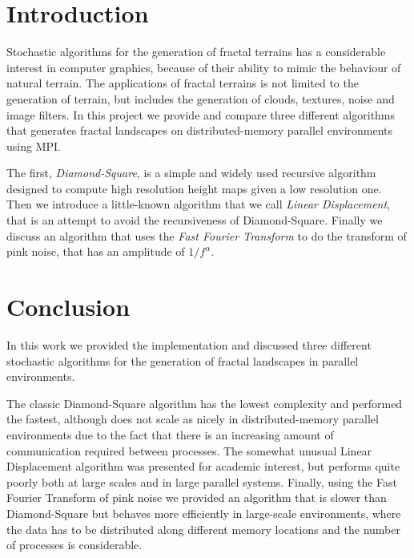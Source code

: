 \section*{Introduction}
Stochastic algorithms for the  generation of fractal terrains has a considerable interest in computer graphics, because of their ability to mimic the behaviour of natural terrain.
The applications of fractal terrains is not limited to the generation of  terrain, but includes the generation of clouds, textures, noise and image filters.
In this project we provide and compare three different algorithms that generates fractal landscapes on distributed-memory parallel environments using MPI.

The first, {\em Diamond-Square}, is a simple and widely used recursive algorithm designed to compute high resolution height maps given a low resolution one.
Then we introduce a little-known algorithm that we call {\em Linear Displacement}, that is an attempt to avoid the recursiveness of Diamond-Square.
Finally we discuss an algorithm that uses the {\em Fast Fourier Transform} to do the transform of pink noise, that has an amplitude of $1/f^\alpha$.


\pagebreak
\FloatBarrier


\pagebreak
\FloatBarrier



\section{Conclusion}
In this work we provided the implementation and discussed three different stochastic algorithms for the generation of fractal landscapes in parallel environments.

The classic Diamond-Square algorithm has the lowest complexity and performed the fastest, although does not scale as nicely in distributed-memory parallel environments due to the fact that there is an increasing amount of communication required between processes. 
The somewhat unusual Linear Displacement algorithm was presented for academic interest, but performs quite poorly both at large scales and in large parallel systems.
Finally, using the Fast Fourier Transform of pink noise we provided an algorithm that is slower than Diamond-Square but behaves more efficiently in large-scale environments, where the data has to be distributed along different memory locations and the number of processes is considerable.

